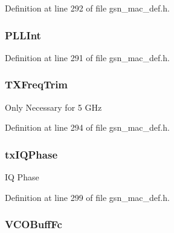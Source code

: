 Definition at line 292 of file gsn\_\-mac\_\-def.h.

\hypertarget{a00118_a27439896821d171d0e83bc12b4056179}{
\subsubsection[{PLLInt}]{ {\bf PLLInt}}}
\label{a00118_a27439896821d171d0e83bc12b4056179}


Definition at line 291 of file gsn\_\-mac\_\-def.h.

\hypertarget{a00118_a74c255aeaa7c0c0fd92081b7663cc183}{
\subsubsection[{TXFreqTrim}]{ {\bf TXFreqTrim}}}
\label{a00118_a74c255aeaa7c0c0fd92081b7663cc183}
Only Necessary for 5 GHz 

Definition at line 294 of file gsn\_\-mac\_\-def.h.

\hypertarget{a00118_a41688730f143281331d4a78967fcf24e}{
\subsubsection[{txIQPhase}]{ {\bf txIQPhase}}}
\label{a00118_a41688730f143281331d4a78967fcf24e}
IQ Phase 

Definition at line 299 of file gsn\_\-mac\_\-def.h.

\hypertarget{a00118_a92c94d34982d29cc4005e3786f3d9935}{
\subsubsection[{VCOBuffFc}]{ {\bf VCOBuffFc}}}
\label{a00118_a92c94d34982d29cc4005e3786f3d9935}


